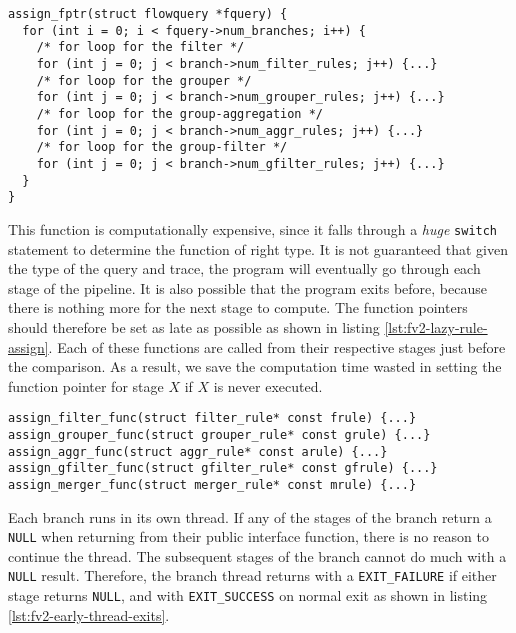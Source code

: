\begin{lstlisting}
assign_fptr(struct flowquery *fquery) {
  for (int i = 0; i < fquery->num_branches; i++) {
    /* for loop for the filter */
    for (int j = 0; j < branch->num_filter_rules; j++) {...}
    /* for loop for the grouper */
    for (int j = 0; j < branch->num_grouper_rules; j++) {...}
    /* for loop for the group-aggregation */
    for (int j = 0; j < branch->num_aggr_rules; j++) {...}
    /* for loop for the group-filter */
    for (int j = 0; j < branch->num_gfilter_rules; j++) {...}
  }
}
\end{lstlisting}

This function is computationally expensive, since it falls through a
\emph{huge} \texttt{switch} statement to determine the function of right type.
It is not guaranteed that given the type of the query and trace, the program
will eventually go through each stage of the pipeline. It is also possible
 that the program exits before, because
there is nothing more for the next stage to compute. The function pointers
should therefore be set as late as possible as shown in listing
\ref{lst:fv2-lazy-rule-assign}. Each of these functions are called from their
respective stages just before the comparison.  As a result, we save the
computation time wasted in setting the function pointer for stage $X$ if $X$
is never executed.

\begin{lstlisting}
assign_filter_func(struct filter_rule* const frule) {...}
assign_grouper_func(struct grouper_rule* const grule) {...}
assign_aggr_func(struct aggr_rule* const arule) {...}
assign_gfilter_func(struct gfilter_rule* const gfrule) {...}
assign_merger_func(struct merger_rule* const mrule) {...}
\end{lstlisting}


Each branch runs in its own thread. If any of the stages of the branch return
a \texttt{NULL} when returning from their public interface function, there is
no  reason to continue the thread. The
subsequent stages of the branch cannot do much with a \texttt{NULL} result.
Therefore, the branch thread returns with a \texttt{EXIT\_FAILURE} if either
stage returns \texttt{NULL}, and with \texttt{EXIT\_SUCCESS} on normal exit as
shown in listing \ref{lst:fv2-early-thread-exits}.

